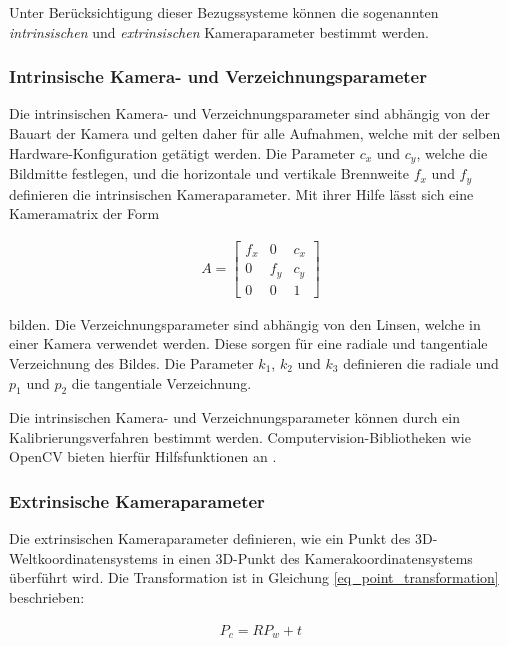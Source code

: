 Unter Berücksichtigung dieser Bezugssysteme können die sogenannten \textit{intrinsischen} und
\textit{extrinsischen} Kameraparameter bestimmt werden.

\subsubsection{Intrinsische Kamera- und Verzeichnungsparameter}

Die intrinsischen Kamera- und Verzeichnungsparameter sind abhängig von der Bauart der Kamera und gelten
daher für alle Aufnahmen, welche mit der selben Hardware-Konfiguration getätigt werden.
Die Parameter $c_x$ und $c_y$, welche die Bildmitte festlegen, und die
horizontale und vertikale Brennweite $f_x$ und $f_y$ definieren die intrinsischen Kameraparameter.
Mit ihrer Hilfe lässt sich eine Kameramatrix der Form

\begin{ceqn}
\begin{align}
A =
 \begin{bmatrix}
  f_x & 0 & c_x \\
  0 & f_y & c_y \\
  0 & 0 & 1
 \end{bmatrix}
\end{align}
\end{ceqn}

bilden.
Die Verzeichnungsparameter sind abhängig von den Linsen, welche in einer Kamera verwendet werden. Diese sorgen
für eine radiale und tangentiale Verzeichnung des Bildes. Die Parameter $k_1$, $k_2$ und $k_3$ definieren die
radiale und $p_1$ und $p_2$ die tangentiale Verzeichnung. \cite[]{Meissner2007}

Die intrinsischen Kamera- und Verzeichnungsparameter können durch ein Kalibrierungsverfahren bestimmt werden.
Computervision-Bibliotheken wie OpenCV bieten hierfür Hilfsfunktionen an \cite[]{DevTeamOpenCV2018}.

\subsubsection{Extrinsische Kameraparameter}

Die extrinsischen Kameraparameter definieren, wie ein Punkt des 3D-Weltkoordinatensystems in einen 3D-Punkt
des Kamerakoordinatensystems überführt wird.
Die Transformation ist in Gleichung \ref{eq_point_transformation} beschrieben:

\begin{ceqn}
\begin{align}
\label{eq_point_transformation}
    P_c = R P_w + t
\end{align}
\end{ceqn}

